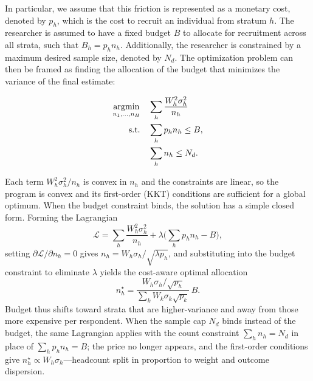 
In particular, we assume that this friction is represented as a monetary cost, denoted by \( p_h \), which is the cost to recruit an individual from stratum \( h \). The researcher is assumed to have a fixed budget \( B \) to allocate for recruitment across all strata, such that \( B_h = p_hn_h \). Additionally, the researcher is constrained by a maximum desired sample size, denoted by \( N_d \). The optimization problem can then be framed as finding the allocation of the budget that minimizes the variance of the final estimate:

\[
\begin{aligned}
\operatorname*{argmin}_{n_1, \ldots, n_H} &\quad \sum_{h} \frac{W_h^2 \sigma_h^2}{n_h} \\
\text{s.t.} &\quad \sum_h p_h n_h \leq B, \\
            &\quad \sum_h n_h \leq N_d.
\end{aligned}
\]



Each term $W_h^2\sigma_h^2/n_h$ is convex in $n_h$ and the constraints are linear, so the program is convex and its first-order (KKT) conditions are sufficient for a global optimum. When the budget constraint binds, the solution has a simple closed form. Forming the Lagrangian
$$
\mathcal{L} = \sum_h \frac{W_h^2\sigma_h^2}{n_h} + \lambda\Big(\sum_h p_h n_h - B\Big),
$$
setting $\partial\mathcal{L}/\partial n_h = 0$ gives $n_h = W_h\sigma_h/\sqrt{\lambda p_h}$, and substituting into the budget constraint to eliminate $\lambda$ yields the cost-aware optimal allocation
$$
n_h^\star = \frac{W_h\sigma_h/\sqrt{p_h}}{\sum_k W_k\sigma_k\sqrt{p_k}}\,B.
$$
Budget thus shifts toward strata that are higher-variance and away from those more expensive per respondent. When the sample cap $N_d$ binds instead of the budget, the same Lagrangian applies with the count constraint $\sum_h n_h = N_d$ in place of $\sum_h p_h n_h = B$; the price no longer appears, and the first-order conditions give $n_h^\star\propto W_h\sigma_h$---headcount split in proportion to weight and outcome dispersion.


